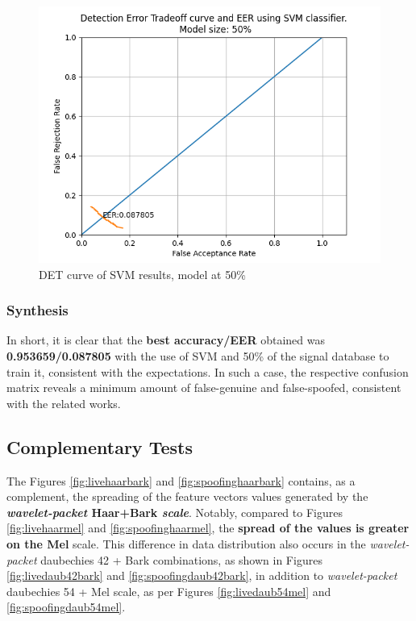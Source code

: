 			\begin{figure}[!h]
				\centering
				\includegraphics[scale=.6]{images/results/det/DET_SVM_50}
				\caption{DET curve of SVM results, model at 50\%}
				\label{fig:detsvm50}
			\end{figure}

			
		
		\subsubsection{Synthesis}
			\par In short, it is clear that the \textbf{best accuracy/EER} obtained was \textbf{0.953659/0.087805} with the use of SVM and 50\% of the signal database to train it, consistent with the expectations. In such a case, the respective confusion matrix reveals a minimum amount of false-genuine and false-spoofed, consistent with the related works.

	\subsection{Complementary Tests}
		\label{sec:testsResults:subsec:Experimento05}
		
		\par The Figures \ref{fig:livehaarbark} and \ref{fig:spoofinghaarbark} contains, as a complement, the spreading of the feature vectors values generated by the \textbf{\textit{wavelet-packet} Haar+Bark \textit{scale}}. Notably, compared to Figures \ref{fig:livehaarmel} and \ref{fig:spoofinghaarmel}, the \textbf{spread of the values is greater on the Mel} scale. This difference in data distribution also occurs in the \textit{wavelet-packet} daubechies 42 + Bark combinations, as shown in Figures \ref{fig:livedaub42bark} and \ref{fig:spoofingdaub42bark}, in addition to \textit{wavelet-packet} daubechies 54 + Mel scale, as per Figures \ref{fig:livedaub54mel} and \ref{fig:spoofingdaub54mel}.
		
